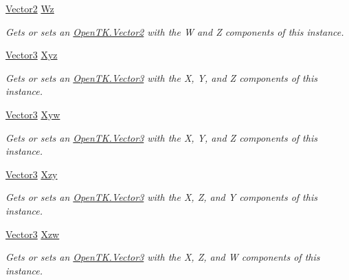 \begin{DoxyCompactItemize}
\hyperlink{struct_open_t_k_1_1_vector2}{Vector2} \hyperlink{struct_open_t_k_1_1_vector4_ade8939578bfd094a45806c8394927770}{Wz}
\begin{DoxyCompactList}\small\item\em Gets or sets an \hyperlink{struct_open_t_k_1_1_vector2}{Open\-T\-K.\-Vector2} with the W and Z components of this instance. \end{DoxyCompactList}\item 
\hyperlink{struct_open_t_k_1_1_vector3}{Vector3} \hyperlink{struct_open_t_k_1_1_vector4_a2beb4e8e347fa25c8deb8e207c43420c}{Xyz}
\begin{DoxyCompactList}\small\item\em Gets or sets an \hyperlink{struct_open_t_k_1_1_vector3}{Open\-T\-K.\-Vector3} with the X, Y, and Z components of this instance. \end{DoxyCompactList}\item 
\hyperlink{struct_open_t_k_1_1_vector3}{Vector3} \hyperlink{struct_open_t_k_1_1_vector4_aa50a2802725d8d0cd9fefafc7166076a}{Xyw}
\begin{DoxyCompactList}\small\item\em Gets or sets an \hyperlink{struct_open_t_k_1_1_vector3}{Open\-T\-K.\-Vector3} with the X, Y, and Z components of this instance. \end{DoxyCompactList}\item 
\hyperlink{struct_open_t_k_1_1_vector3}{Vector3} \hyperlink{struct_open_t_k_1_1_vector4_a37dfb24fdb8b51e9bb06efe376c5103c}{Xzy}
\begin{DoxyCompactList}\small\item\em Gets or sets an \hyperlink{struct_open_t_k_1_1_vector3}{Open\-T\-K.\-Vector3} with the X, Z, and Y components of this instance. \end{DoxyCompactList}\item 
\hyperlink{struct_open_t_k_1_1_vector3}{Vector3} \hyperlink{struct_open_t_k_1_1_vector4_a6bc1c65cf068055bcb0be9ee07fd9699}{Xzw}
\begin{DoxyCompactList}\small\item\em Gets or sets an \hyperlink{struct_open_t_k_1_1_vector3}{Open\-T\-K.\-Vector3} with the X, Z, and W components of this instance. \end{DoxyCompactList}\item 

\end{DoxyCompactItemize}
